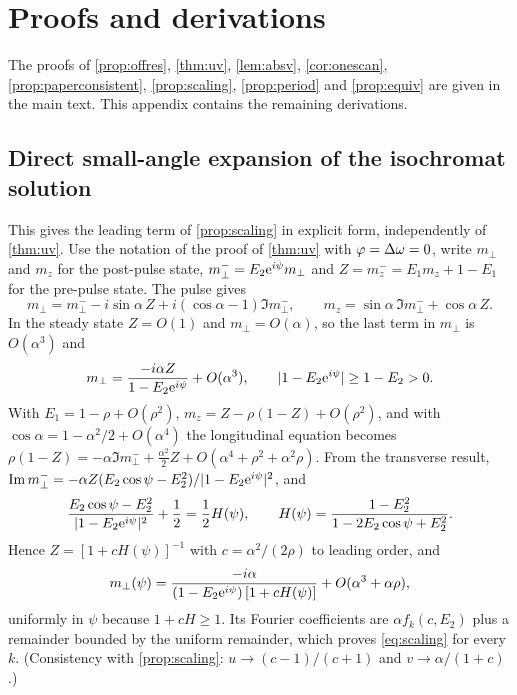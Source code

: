 \section{Proofs and derivations}\label{app:proofs}

The proofs of \cref{prop:offres}, \cref{thm:uv}, \cref{lem:absv}, \cref{cor:onescan},
\cref{prop:paperconsistent}, \cref{prop:scaling}, \cref{prop:period} and \cref{prop:equiv} are
given in the main text. This appendix contains the remaining derivations.

\subsection{Direct small-angle expansion of the isochromat solution}\label{app:scaling}

This gives the leading term of \cref{prop:scaling} in explicit form, independently of
\cref{thm:uv}. Use the notation of the proof of \cref{thm:uv} with $\varphi=\Delta\omega=0$, write
$m_\perp$ and $m_z$ for the post-pulse state, $m_\perp^-=E_2\mathrm{e}^{i\psi}m_\perp$ and
$Z=m_z^-=E_1m_z+1-E_1$ for the pre-pulse state. The pulse gives
\[
  m_\perp=m_\perp^--i\sin\alpha\,Z+i(\cos\alpha-1)\Im m_\perp^-,\qquad
  m_z=\sin\alpha\,\Im m_\perp^-+\cos\alpha\,Z .
\]
In the steady state $Z=O(1)$ and $m_\perp=O(\alpha)$, so the last term in $m_\perp$ is $O(\alpha^3)$ and
\begin{equation}
  m_\perp=\frac{-i\alpha Z}{1-E_2\mathrm{e}^{i\psi}}+O(\alpha^3),\qquad |1-E_2\mathrm{e}^{i\psi}|\ge1-E_2>0 .
\end{equation}
With $E_1=1-\rho+O(\rho^2)$, $m_z=Z-\rho(1-Z)+O(\rho^2)$, and with $\cos\alpha=1-\alpha^2/2+O(\alpha^4)$ the
longitudinal equation becomes
$\rho(1-Z)=-\alpha\Im m_\perp^-+\tfrac{\alpha^2}{2}Z+O(\alpha^4+\rho^2+\alpha^2\rho)$. From the transverse result,
$\operatorname{Im} m_\perp^-=-\alpha Z(E_2\cos\psi-E_2^2)/|1-E_2\mathrm{e}^{i\psi}|^2$, and
\[
  \frac{E_2\cos\psi-E_2^2}{|1-E_2\mathrm{e}^{i\psi}|^2}+\frac12=\frac12H(\psi),\qquad
  H(\psi)=\frac{1-E_2^2}{1-2E_2\cos\psi+E_2^2}.
\]
Hence $Z=[1+cH(\psi)]^{-1}$ with $c=\alpha^2/(2\rho)$ to leading order, and
\begin{equation}
  m_\perp(\psi)=\frac{-i\alpha}{(1-E_2\mathrm{e}^{i\psi})\,[1+cH(\psi)]}+O(\alpha^3+\alpha\rho),
\end{equation}
uniformly in $\psi$ because $1+cH\ge1$. Its Fourier coefficients are $\alpha f_k(c,E_2)$ plus a
remainder bounded by the uniform remainder, which proves \eqref{eq:scaling} for every $k$.
(Consistency with \cref{prop:scaling}: $u\to(c-1)/(c+1)$ and $v\to\alpha/(1+c)$.)


